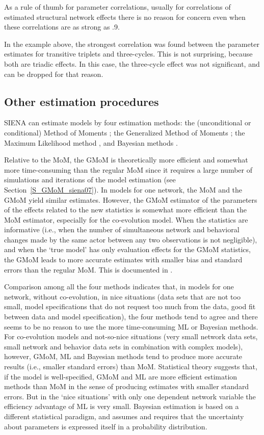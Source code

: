 \documentclass[a4paper,fleqn,11pt]{article}
\newcommand{\+}{\, + \,}
\newcommand{\SI}{{\sf SIENA }}
\begin{document}
As a rule of thumb for parameter correlations,
usually for correlations of estimated structural network effects there is no
reason for concern even when these correlations
are as strong as .9.

In the example above, the strongest correlation was found between
the parameter estimates for transitive triplets and three-cycles.
This is not surprising, because both are triadic effects.
In this case, the three-cycle effect was not significant,
and can be dropped for that reason.

\subsection{Other estimation procedures}

\SI can estimate models by four estimation methods:
the (unconditional or conditional)
Method of Moments \citep*[`MoM', the default; ][]{Snijders01, SnijdersEA07};
the Generalized Method of Moments \citep*[`GMoM', see][]{ASS2015,ASS2019};
the Maximum Likelihood method \citep*[`ML', see][]{SnijdersEA10a},
and Bayesian methods
\citep[see][]{Koskinen04,KoskinenSnijders07,SchweinbergerSnijders07c,KoskinenSnijders2022}.


Relative to the MoM, the GMoM is theoretically more efficient and somewhat more time-consuming
than the regular MoM since it requires a large number of simulations and
iterations of the model estimation (see Section~\ref{S_GMoM_siena07}).
In models for one network, the MoM and the GMoM yield similar estimates.
However, the GMoM estimator of the parameters of the effects related to the new statistics
is somewhat more efficient than the MoM estimator, especially for the co-evolution model.
When the statistics are informative (i.e., when the number of simultaneous network
and behavioral changes made by the same actor between any two observations is not negligible),
and when the `true model' has only evaluation effects for the GMoM statistics,
the GMoM leads to more accurate estimates with smaller bias
and standard errors than the regular MoM.
This is documented in \citet{ASS2015,ASS2019}.

Comparison among all the four methods indicates that,
in models for one network, without co-evolution,
in nice situations (data sets that are not too small, model specifications
that do not request too much from the data, good fit between data and
model specification), the four methods tend to agree
and there seems to be no reason to use the more time-consuming
ML or Bayesian methods.
For co-evolution models and not-so-nice situations (very small network data sets,
small network and behavior data sets in combination with complex models),
however, GMoM, ML and Bayesian methods tend to produce more accurate results
(i.e., smaller standard errors) than MoM.
Statistical theory suggests that, if the model is well-specified,
GMoM and ML are more efficient estimation methods
than MoM in the sense of producing estimates with smaller standard errors.
But in the `nice situations'
with only one dependent network variable the efficiency advantage of ML is very small.
Bayesian estimation is based on a different statistical paradigm, and
assumes and requires that the uncertainty about parameters is expressed
itself in a probability distribution.
\end{document}
